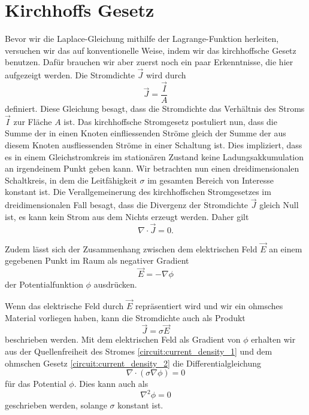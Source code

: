 %
%
%
%
\section{Kirchhoffs Gesetz
\label{circuit:section:teil1}}
Bevor wir die Laplace-Gleichung mithilfe der Lagrange-Funktion herleiten, versuchen wir das auf konventionelle Weise, indem wir  das kirchhoffsche Gesetz benutzen. 
Dafür brauchen wir aber zuerst noch ein paar Erkenntnisse, die hier aufgezeigt werden. Die Stromdichte $\vec{J}$ wird durch
\begin{equation}
	\vec{J}=\frac{\vec{I}}{A}
	\label{circuit:current_density_3}
\end{equation}
definiert. Diese Gleichung besagt, dass die Stromdichte das Verhältnis des Stroms $\vec{I}$ zur Fläche $A$ ist. 
Das kirchhoffsche Stromgesetz postuliert nun, dass die Summe der in einen Knoten einfliessenden Ströme gleich der Summe der aus diesem Knoten ausfliessenden Ströme in einer Schaltung ist. Dies impliziert, dass es in einem Gleichstromkreis im stationären Zustand keine Ladungsakkumulation an irgendeinem Punkt geben kann. Wir betrachten nun einen dreidimensionalen Schaltkreis, in dem die Leitfähigkeit $\sigma$ im gesamten Bereich von Interesse konstant ist. Die Verallgemeinerung des kirchhoffschen Stromgesetzes im dreidimensionalen Fall besagt, dass die Divergenz der Stromdichte $\vec{J}$ gleich Null ist, es kann kein Strom aus dem Nichts erzeugt werden. Daher gilt 
\begin{equation}
	\nabla \cdot  \vec{J}=0.
	\label{circuit:current_density_1}
\end{equation}

Zudem lässt sich der Zusammenhang zwischen dem elektrischen Feld $\vec{E}$ an einem gegebenen Punkt im Raum als negativer Gradient 
\begin{equation}
	\vec{E}=-\nabla \phi
	\label{circuit:current_density_4}
\end{equation}
der Potentialfunktion $\phi$ ausdrücken.

Wenn das elektrische Feld durch $\vec{E}$ repräsentiert wird und wir ein ohmsches Material vorliegen haben, kann die Stromdichte auch als Produkt  
\begin{equation}
\vec{J}=\sigma \vec{E}
\label{circuit:current_density_2}
\end{equation}
beschrieben werden.
Mit dem elektrischen Feld als Gradient von $\phi$ erhalten wir aus der Quellenfreiheit des Stromes \eqref{circuit:current_density_1} und dem ohmschen Gesetz \eqref{circuit:current_density_2} die Differentialgleichung 
\begin{equation}
	\nabla \cdot (\sigma \nabla \phi)=0
	\label{circuit:current_density_5}
\end{equation}
für das Potential $\phi$. Dies kann auch als
\begin{equation}
\nabla^2 \phi=0
\label{circuit:current_density_6}
\end{equation}
geschrieben werden, solange $\sigma$ konstant ist.

